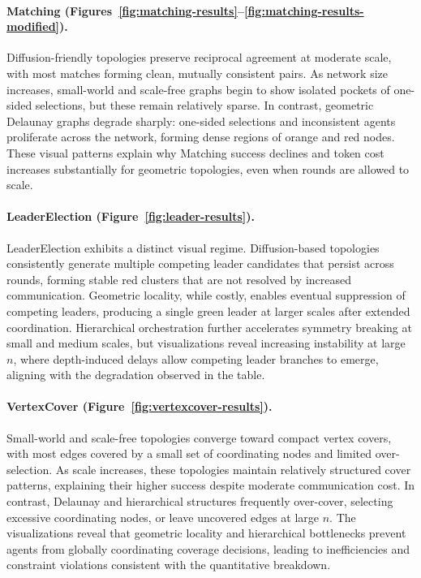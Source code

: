 \paragraph{Matching (Figures~\ref{fig:matching-results}–\ref{fig:matching-results-modified}).}
Diffusion-friendly topologies preserve reciprocal agreement at moderate scale, with most matches forming clean, mutually consistent pairs. As network size increases, small-world and scale-free graphs begin to show isolated pockets of one-sided selections, but these remain relatively sparse. In contrast, geometric Delaunay graphs degrade sharply: one-sided selections and inconsistent agents proliferate across the network, forming dense regions of orange and red nodes. These visual patterns explain why Matching success declines and token cost increases substantially for geometric topologies, even when rounds are allowed to scale.

\paragraph{LeaderElection (Figure~\ref{fig:leader-results}).}
LeaderElection exhibits a distinct visual regime. Diffusion-based topologies consistently generate multiple competing leader candidates that persist across rounds, forming stable red clusters that are not resolved by increased communication. Geometric locality, while costly, enables eventual suppression of competing leaders, producing a single green leader at larger scales after extended coordination. Hierarchical orchestration further accelerates symmetry breaking at small and medium scales, but visualizations reveal increasing instability at large \(n\), where depth-induced delays allow competing leader branches to emerge, aligning with the degradation observed in the table.

\paragraph{VertexCover (Figure~\ref{fig:vertexcover-results}).}
Small-world and scale-free topologies converge toward compact vertex covers, with most edges covered by a small set of coordinating nodes and limited over-selection. As scale increases, these topologies maintain relatively structured cover patterns, explaining their higher success despite moderate communication cost. In contrast, Delaunay and hierarchical structures frequently over-cover, selecting excessive coordinating nodes, or leave uncovered edges at large \(n\). The visualizations reveal that geometric locality and hierarchical bottlenecks prevent agents from globally coordinating coverage decisions, leading to inefficiencies and constraint violations consistent with the quantitative breakdown.


